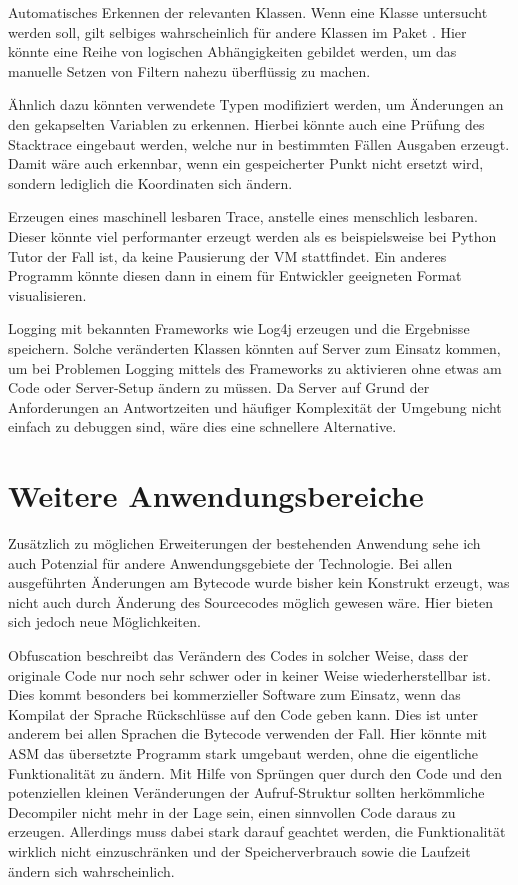 Automatisches Erkennen der relevanten Klassen. Wenn eine Klasse  untersucht werden soll, gilt selbiges wahrscheinlich für andere Klassen im Paket . Hier könnte eine Reihe von logischen Abhängigkeiten gebildet werden, um das manuelle Setzen von Filtern nahezu überflüssig zu machen.

Ähnlich dazu könnten verwendete Typen modifiziert werden, um Änderungen an den gekapselten Variablen zu erkennen. Hierbei könnte auch eine Prüfung des Stacktrace eingebaut werden, welche nur in bestimmten Fällen Ausgaben erzeugt. Damit wäre auch erkennbar, wenn ein gespeicherter Punkt nicht ersetzt wird, sondern lediglich die Koordinaten sich ändern.

Erzeugen eines maschinell lesbaren Trace, anstelle eines menschlich lesbaren. Dieser könnte viel performanter erzeugt werden als es beispielsweise bei Python Tutor der Fall ist, da keine Pausierung der \ac{VM} stattfindet. Ein anderes Programm könnte diesen dann in einem für Entwickler geeigneten Format visualisieren.

Logging mit bekannten Frameworks wie Log4j erzeugen und die Ergebnisse speichern. Solche veränderten Klassen könnten auf Server zum Einsatz kommen, um bei Problemen Logging mittels des Frameworks zu aktivieren ohne etwas am Code oder Server-Setup ändern zu müssen. Da Server auf Grund der Anforderungen an Antwortzeiten und häufiger Komplexität der Umgebung nicht einfach zu debuggen sind, wäre dies eine schnellere Alternative.

\section{Weitere Anwendungsbereiche} 

Zusätzlich zu möglichen Erweiterungen der bestehenden Anwendung sehe ich auch Potenzial für andere Anwendungsgebiete der Technologie. Bei allen ausgeführten Änderungen am Bytecode wurde bisher kein Konstrukt erzeugt, was nicht auch durch Änderung des Sourcecodes möglich gewesen wäre. Hier bieten sich jedoch neue Möglichkeiten.

Obfuscation beschreibt das Verändern des Codes in solcher Weise, dass der originale Code nur noch sehr schwer oder in keiner Weise wiederherstellbar ist. Dies kommt besonders bei kommerzieller Software zum Einsatz, wenn das Kompilat der Sprache Rückschlüsse auf den Code geben kann. Dies ist unter anderem bei allen Sprachen die Bytecode verwenden der Fall.
Hier könnte mit ASM das übersetzte Programm stark umgebaut werden, ohne die eigentliche Funktionalität zu ändern. Mit Hilfe von Sprüngen quer durch den Code und den potenziellen kleinen Veränderungen der Aufruf-Struktur sollten herkömmliche Decompiler nicht mehr in der Lage sein, einen sinnvollen Code daraus zu erzeugen. Allerdings muss dabei stark darauf geachtet werden, die Funktionalität wirklich nicht einzuschränken und der Speicherverbrauch sowie die Laufzeit ändern sich wahrscheinlich.

